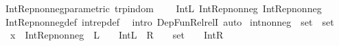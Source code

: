 \begin{isabellebody}
\isadelimdocument
%
\endisadelimdocument
%
\isatagdocument
%
\isamarkuptrue%
%
\endisatagdocument
{\isafolddocument}%
%
\isadelimdocument
%
\endisadelimdocument
{}\isamarkupfalse%
\ Int{\isacharunderscore}{\kern0pt}Rep{\isacharunderscore}{\kern0pt}nonneg{\isacharunderscore}{\kern0pt}parametric\ {\isacharbrackleft}{\kern0pt}trp{\isacharunderscore}{\kern0pt}in{\isacharunderscore}{\kern0pt}dom{\isacharbrackright}{\kern0pt}{\isacharcolon}{\kern0pt}\isanewline
\ \ {\isachardoublequoteopen}{\isacharparenleft}{\kern0pt}{\isacharparenleft}{\kern0pt}{\isacharequal}{\kern0pt}\isactrlbsub {\isasymnat}\isactrlesub {\isacharparenright}{\kern0pt}\ {\isasymRrightarrow}\ Int{\isachardot}{\kern0pt}L{\isacharparenright}{\kern0pt}\ Int{\isacharunderscore}{\kern0pt}Rep{\isacharunderscore}{\kern0pt}nonneg\ Int{\isacharunderscore}{\kern0pt}Rep{\isacharunderscore}{\kern0pt}nonneg{\isachardoublequoteclose}\isanewline
%
\isadelimproof
\ \ %
\endisadelimproof
%
\isatagproof
{}\isamarkupfalse%
\ Int{\isacharunderscore}{\kern0pt}Rep{\isacharunderscore}{\kern0pt}nonneg{\isacharunderscore}{\kern0pt}def\ int{\isacharunderscore}{\kern0pt}rep{\isacharunderscore}{\kern0pt}def\ \isamarkupfalse%
\ {\isacharparenleft}{\kern0pt}intro\ Dep{\isacharunderscore}{\kern0pt}Fun{\isacharunderscore}{\kern0pt}Rel{\isacharunderscore}{\kern0pt}relI{\isacharparenright}{\kern0pt}\ auto%
\endisatagproof
{\isafoldproof}%
%
\isadelimproof
\isanewline
%
\endisadelimproof
\isanewline
{}\isamarkupfalse%
\ int{\isacharunderscore}{\kern0pt}nonneg\ {\isacharcolon}{\kern0pt}{\isacharcolon}{\kern0pt}\ {\isachardoublequoteopen}set\ {\isasymRightarrow}\ set{\isachardoublequoteclose}\ \isanewline
\ \ x\ {\isacharequal}{\kern0pt}\ Int{\isacharunderscore}{\kern0pt}Rep{\isacharunderscore}{\kern0pt}nonneg\ \ L\ {\isacharequal}{\kern0pt}\ {\isachardoublequoteopen}{\isacharparenleft}{\kern0pt}{\isacharequal}{\kern0pt}\isactrlbsub {\isasymnat}\isactrlesub {\isacharparenright}{\kern0pt}\ {\isasymRrightarrow}\ Int{\isachardot}{\kern0pt}L{\isachardoublequoteclose}\ \ R\ {\isacharequal}{\kern0pt}\ {\isachardoublequoteopen}{\isacharparenleft}{\kern0pt}{\isacharparenleft}{\kern0pt}{\isacharequal}{\kern0pt}\isactrlbsub {\isasymnat}\isactrlesub {\isacharparenright}{\kern0pt}\ {\isacharcolon}{\kern0pt}{\isacharcolon}{\kern0pt}\ set\ {\isasymRightarrow}\ {\isacharunderscore}{\kern0pt}{\isacharparenright}{\kern0pt}\ {\isasymRrightarrow}\ Int{\isachardot}{\kern0pt}R{\isachardoublequoteclose}\isanewline

\end{isabellebody}
